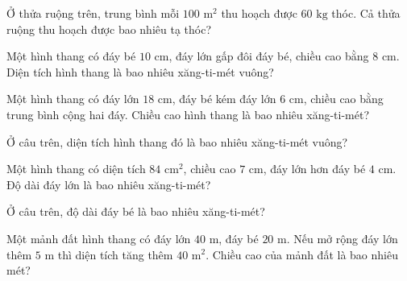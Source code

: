 \begin{ex}
  Ở thửa ruộng trên, trung bình mỗi $100\text{ m}^2$ thu hoạch được $60\text{ kg}$ thóc. Cả thửa ruộng thu hoạch được bao nhiêu tạ thóc?
\end{ex}

\begin{ex}
  Một hình thang có đáy bé $10\text{ cm}$, đáy lớn gấp đôi đáy bé, chiều cao bằng $8\text{ cm}$. Diện tích hình thang là bao nhiêu xăng-ti-mét vuông?
\end{ex}

\begin{ex}
  Một hình thang có đáy lớn $18\text{ cm}$, đáy bé kém đáy lớn $6\text{ cm}$, chiều cao bằng trung bình cộng hai đáy. Chiều cao hình thang là bao nhiêu xăng-ti-mét?
\end{ex}

\begin{ex}
  Ở câu trên, diện tích hình thang đó là bao nhiêu xăng-ti-mét vuông?
\end{ex}

\begin{ex}
  Một hình thang có diện tích $84\text{ cm}^2$, chiều cao $7\text{ cm}$, đáy lớn hơn đáy bé $4\text{ cm}$. Độ dài đáy lớn là bao nhiêu xăng-ti-mét?
\end{ex}

\begin{ex}
  Ở câu trên, độ dài đáy bé là bao nhiêu xăng-ti-mét?
\end{ex}

\begin{ex}
  Một mảnh đất hình thang có đáy lớn $40\text{ m}$, đáy bé $20\text{ m}$. Nếu mở rộng đáy lớn thêm $5\text{ m}$ thì diện tích tăng thêm $40\text{ m}^2$. Chiều cao của mảnh đất là bao nhiêu mét?
\end{ex}

